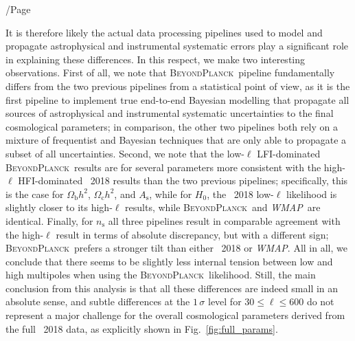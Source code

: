 /Page\documentclass[twocolumn]{aa}
\def\WMAP{\textit{WMAP}}
\newcommand{\BP}{\textsc{BeyondPlanck}}
\begin{document}
It is therefore likely the actual data processing pipelines used to
model and propagate astrophysical and instrumental systematic errors
play a significant role in explaining these differences. In this
respect, we make two interesting observations. First of all, we note
that \BP\ pipeline fundamentally differs from the two previous
pipelines from a statistical point of view, as it is the first
pipeline to implement true end-to-end Bayesian modelling that
propagate all sources of astrophysical and instrumental systematic
uncertainties to the final cosmological parameters; in comparison, the
other two pipelines both rely on a mixture of frequentist and Bayesian
techniques that are only able to propagate a subset of all
uncertainties. Second, we note that the low-$\ell$ LFI-dominated
\BP\ results are for several parameters more consistent with the
high-$\ell$ HFI-dominated \Planck\ 2018 results than the two previous
pipelines; specifically, this is the case for $\Omega_\mathrm{b}h^2$,
$\Omega_\mathrm{c}h^2$, and $A_{\mathrm{s}}$, while for $H_0$, the
\Planck\ 2018 low-$\ell$ likelihood is slightly closer to its
high-$\ell$ results, while \BP\ and \WMAP\ are identical. Finally, for
$n_\mathrm{s}$ all three pipelines result in comparable agreement with
the high-$\ell$ result in terms of absolute discrepancy, but with a
different sign; \BP\ prefers a stronger tilt than either \Planck\ 2018
or \WMAP. All in all, we conclude that there seems to be slightly less
internal tension between low and high multipoles when using the
\BP\ likelihood. Still, the main conclusion from this analysis is that
all these differences are indeed small in an absolute sense, and
subtle differences at the $1\,\sigma$ level for $30\le\ell\le 600$ do
not represent a major challenge for the overall cosmological
parameters derived from the full \Planck\ 2018 data, as explicitly
shown in Fig.~\ref{fig:full_params}.
\end{document}
